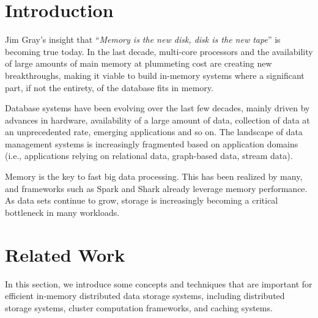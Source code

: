 \documentclass[twocolumn]{article}
\newcommand*\DNA{\textsc{dna}}
\newcommand*\Let[2]{\State #1 $\gets$ #2}
\begin{document}

\section{Introduction}
Jim Gray's insight that ``\textit{Memory is the new disk, disk is the new tape}'' is becoming true today. 
In the last decade, multi-core processors and the availability of large amounts of main memory at
plummeting cost are creating new breakthroughs, making it viable to
build in-memory systems where a significant part, if not the entirety,
of the database fits in memory.%

Database systems have been evolving over the last few decades, mainly
driven by advances in hardware, availability of a large amount of data,
collection of data at an unprecedented rate, emerging applications and
so on. The landscape of data management systems is increasingly
fragmented based on application domains (i.e., applications relying on
relational data, graph-based data, stream data).

Memory is the key to fast big data processing. This has been realized by many, and frameworks such as Spark and Shark already leverage memory performance. As data sets continue to grow, storage is increasingly becoming a critical bottleneck in many workloads.

\section{Related Work}
In this section, we introduce some concepts and techniques that are important for efficient in-memory distributed data storage systems, including distributed storage systems, cluster computation frameworks, and caching systems.
\end{document}
